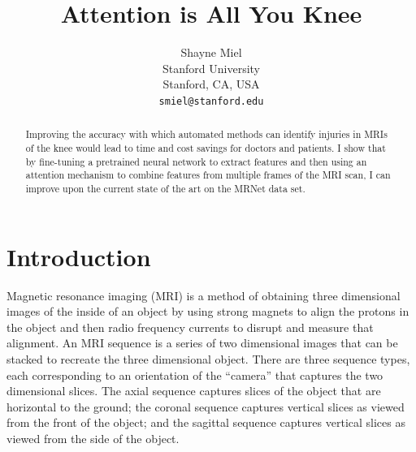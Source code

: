\documentclass[10pt,twocolumn,letterpaper]{article}
\begin{document}
\title{Attention is All You Knee}

\author{Shayne Miel\\
Stanford University\\
Stanford, CA, USA\\
{\tt\small smiel@stanford.edu}
}

\maketitle

\begin{abstract}
   Improving the accuracy with which automated methods can identify injuries in
   MRIs of the knee would lead to time and cost savings for doctors and patients.
   I show that by fine-tuning a pretrained neural network to extract features
   and then using an attention mechanism to combine features from multiple
   frames of the MRI scan, I can improve upon the current state of the art on
   the MRNet data set.
\end{abstract}

\section{Introduction} %

Magnetic resonance imaging (MRI) is a method of obtaining three dimensional images of the inside of an object by using strong magnets to align the protons in the object and then radio frequency currents to disrupt and measure that alignment. An MRI sequence is a series of two dimensional images that can be stacked to recreate the three dimensional object. There are three sequence types, each corresponding to an orientation of the ``camera'' that captures the two dimensional slices. The axial sequence captures slices of the object that are horizontal to the ground; the coronal sequence captures vertical slices as viewed from the front of the object; and the sagittal sequence captures vertical slices as viewed from the side of the object.
\end{document}
